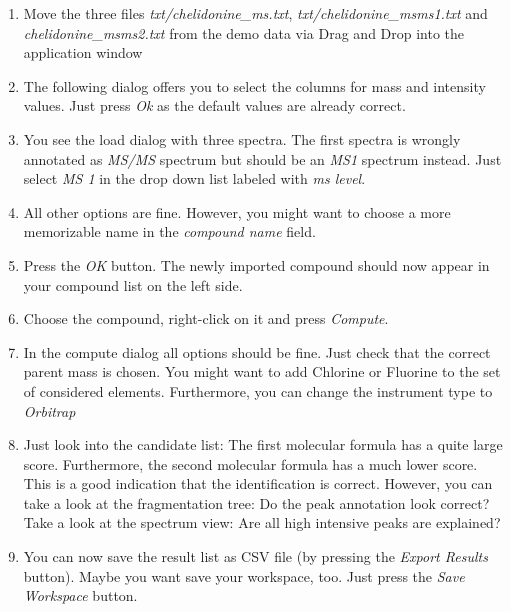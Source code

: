 \documentclass[letterpaper,10pt,openany,oneside]{sphinxmanual}
\begin{document}
\begin{enumerate}
\item {} 
Move the three files \emph{txt/chelidonine\_ms.txt}, \emph{txt/chelidonine\_msms1.txt} and \emph{chelidonine\_msms2.txt} from the demo data via Drag and Drop into the application window

\item {} 
The following dialog offers you to select the columns for mass and intensity values. Just press \emph{Ok} as the default values are already correct.

\item {} 
You see the load dialog with three spectra. The first spectra is wrongly
annotated as \emph{MS/MS} spectrum but should be an \emph{MS1} spectrum
instead. Just select \emph{MS 1} in the drop down list labeled with \emph{ms
level}.

\item {} 
All other options are fine. However, you might want to choose a more memorizable name in the \emph{compound name} field.

\item {} 
Press the \emph{OK} button. The newly imported compound should now appear in your compound list on the left side.

\item {} 
Choose the compound, right-click on it and press \emph{Compute}.

\item {} 
In the compute dialog all options should be fine. Just check that the correct parent mass is chosen. You might want to add Chlorine or Fluorine to the set of considered elements. Furthermore, you can change the instrument type to \emph{Orbitrap}

\item {} 
Just look into the candidate list: The first molecular formula has a quite large score. Furthermore, the second molecular formula has a much lower score. This is a good indication that the identification is correct. However, you can take a look at the fragmentation tree: Do the peak annotation look correct? Take a look at the spectrum view: Are all high intensive peaks are explained?

\item {} 
You can now save the result list as CSV file (by pressing the \emph{Export Results} button). Maybe you want save your workspace, too. Just press the \emph{Save Workspace} button.

\end{enumerate}
\end{document}

